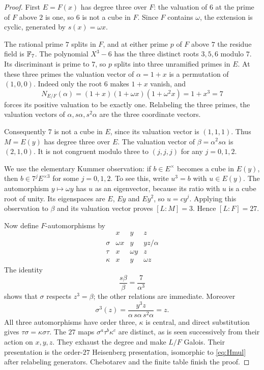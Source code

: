 \documentclass[11pt]{article}
\theoremstyle{definition}\newtheorem{definition}[theorem]{Definition}
\theoremstyle{remark}\newtheorem{remark}[theorem]{Remark}
\begin{document}
\begin{proof}
First $E=F(x)$ has degree three over $F$: the valuation of $6$ at the prime of $F$ above $2$ is one, so $6$ is not a cube in $F$. Since $F$ contains $\omega$, the extension is cyclic, generated by $s(x)=\omega x$.

The rational prime $7$ splits in $F$, and at either prime $\mathit p$ of $F$ above $7$ the residue field is $\mathbb F_7$. The polynomial $X^3-6$ has the three distinct roots $3,5,6$ modulo $7$. Its discriminant is prime to $7$, so $\mathit p$ splits into three unramified primes in $E$. At these three primes the valuation vector of $\alpha=1+x$ is a permutation of $(1,0,0)$. Indeed only the root $6$ makes $1+x$ vanish, and
\[
 N_{E/F}(\alpha)=(1+x)(1+\omega x)(1+\omega^2x)=1+x^3=7
\]
forces its positive valuation to be exactly one. Relabeling the three primes, the valuation vectors of $\alpha,s\alpha,s^2\alpha$ are the three coordinate vectors.

Consequently $7$ is not a cube in $E$, since its valuation vector is $(1,1,1)$. Thus $M=E(y)$ has degree three over $E$. The valuation vector of $\beta=\alpha^2s\alpha$ is $(2,1,0)$. It is not congruent modulo three to $(j,j,j)$ for any $j=0,1,2$.

We use the elementary Kummer observation: if $b\in E^\times$ becomes a cube in $E(y)$, then $b\in 7^jE^{\times3}$ for some $j=0,1,2$. To see this, write $u^3=b$ with $u\in E(y)$. The automorphism $y\mapsto\omega y$ has $u$ as an eigenvector, because its ratio with $u$ is a cube root of unity. Its eigenspaces are $E$, $Ey$ and $Ey^2$, so $u=cy^j$. Applying this observation to $\beta$ and its valuation vector proves $[L:M]=3$. Hence $[L:F]=27$.

Now define $F$-automorphisms by
\[
 \begin{array}{c|ccc}
       &x&y&z\\\hline
 \sigma&\omega x&y&yz/\alpha\\
 \tau&x&\omega y&z\\
 \kappa&x&y&\omega z
 \end{array}
\]
The identity
\[
 \frac{s\beta}{\beta}=\frac7{\alpha^3}
\]
shows that $\sigma$ respects $z^3=\beta$; the other relations are immediate. Moreover
\[
 \sigma^3(z)=\frac{y^3z}{\alpha\,s\alpha\,s^2\alpha}=z.
\]
All three automorphisms have order three, $\kappa$ is central, and direct substitution gives
$\tau\sigma=\kappa\sigma\tau$. The $27$ maps $\sigma^a\tau^b\kappa^c$ are distinct, as is seen successively from their action on $x,y,z$. They exhaust the degree and make $L/F$ Galois. Their presentation is the order-$27$ Heisenberg presentation, isomorphic to \eqref{eq:Hmul} after relabeling generators. Chebotarev and the finite table finish the proof.
\end{proof}
\end{document}
